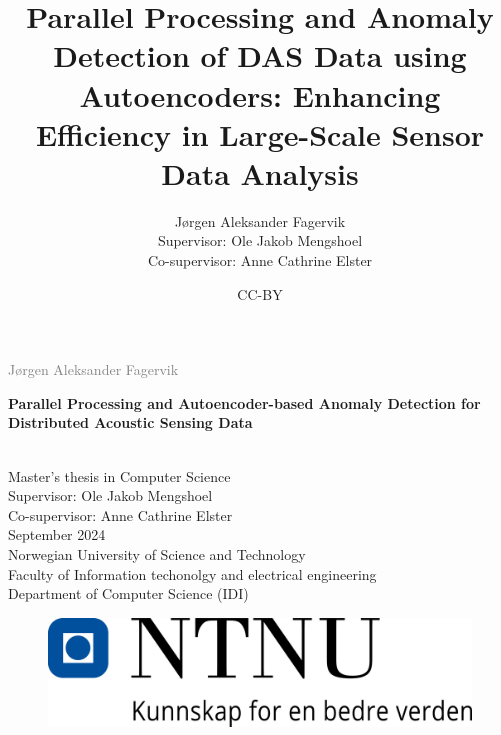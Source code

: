 \documentclass[british]{ntnuthesis}
\title{Parallel Processing and Anomaly Detection of DAS Data using Autoencoders: Enhancing Efficiency in Large-Scale Sensor Data Analysis}
\author{Jørgen Aleksander Fagervik \\
        Supervisor: Ole Jakob Mengshoel \\
        Co-supervisor: Anne Cathrine Elster}
\date{CC-BY \ntnuthesisdate}
\begin{document}
\begin{titlepage}
\vspace*{1.5cm}

\noindent  \textcolor{gray}{\large Jørgen Aleksander Fagervik} \\
\vspace{1cm}

\noindent \textbf{\Large Parallel Processing and Autoencoder-based Anomaly Detection for Distributed Acoustic Sensing Data} \\
\vspace{0.5cm}

 \\



\vspace{7cm}
\noindent Master's thesis in Computer Science \\
Supervisor: Ole Jakob Mengshoel \\
Co-supervisor: Anne Cathrine Elster \\
September 2024 \\

\vspace{0.2cm}
\noindent Norwegian University of Science and Technology \\
Faculty of Information techonolgy and electrical engineering \\
Department of Computer Science (IDI) \\

\begin{figure}[h]
\includegraphics[scale=0.5]{figures/ntnu.png}
\end{figure}
\end{titlepage}
\restoregeometry
\myemptypage 





\tableofcontents
\listoffigures
\listoftables
\lstlistoflistings

\printglossary[type=\acronymtype] %
\printglossary                    %










\chapter*{\bibname}
\printbibliography[heading=none]

\appendix






\end{document}
